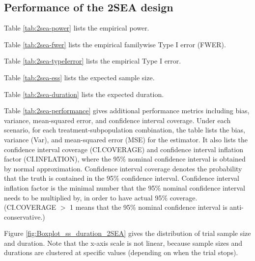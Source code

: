 \documentclass{article}\usepackage[]{graphicx}\usepackage[]{color}
\makeatletter
\newenvironment{kframe}{%
 \def\at@end@of@kframe{}%
 \ifinner\ifhmode%
  \def\at@end@of@kframe{\end{minipage}}%
  \begin{minipage}{\columnwidth}%
 \fi\fi%
 \def\FrameCommand##1{\hskip\@totalleftmargin \hskip-\fboxsep
 \colorbox{shadecolor}{##1}\hskip-\fboxsep
     \hskip-\linewidth \hskip-\@totalleftmargin \hskip\columnwidth}%
 \MakeFramed {\advance\hsize-\width
   \@totalleftmargin\z@ \linewidth\hsize
   \@setminipage}}%
 {\par\unskip\endMakeFramed%
 \at@end@of@kframe}
\numberwithin{table}{section}
\numberwithin{figure}{section}
\makeatother
\begin{document}
\subsection{Performance of the 2SEA design}


Table \ref{tab:2sea-power} lists the empirical power.

Table \ref{tab:2sea-fwer} lists the empirical familywise Type I error (FWER).

Table \ref{tab:2sea-typeIerror} lists the empirical Type I error.

Table \ref{tab:2sea-ess} lists the expected sample size.

Table \ref{tab:2sea-duration} lists the expected duration.

Table \ref{tab:2sea-performance} gives additional performance metrics including bias, variance, mean-squared error, and confidence interval coverage. Under each scenario, for each treatment-subpopulation combination, the table lists the bias, variance (Var), and mean-squared error (MSE) for the estimator. It also lists the confidence interval coverage (CI.COVERAGE) and confidence interval inflation factor (CI.INFLATION), where the 95\% nominal confidence interval is obtained by normal approximation. Confidence interval coverage denotes the probability that the truth is contained in the 95\% confidence interval. Confidence interval inflation factor is the minimal number that the 95\% nominal confidence interval needs to be multiplied by, in order to have actual 95\% coverage. (CI.COVERAGE $>$ 1 means that the 95\% nominal confidence interval is anti-conservative.)

Figure \ref{fig:Boxplot_ss_duration_2SEA} gives the distribution of trial sample size and duration. Note that the x-axis scale is not linear, because sample sizes and durations are clustered at specific values (depending on when the trial stops).

\begin{kframe}


{\ttfamily\noindent\bfseries{}}

{\ttfamily\noindent\bfseries\color{errorcolor}{\#\# Error in cbind(tsea.result\$optima\$empirical.power, tsea.result\$optima\$conj.power): object 'tsea.result' not found}}

{\ttfamily\noindent\bfseries\color{errorcolor}{\#\# Error in names(x) <- value: 'names' attribute [1] must be the same length as the vector [0]}}

{\ttfamily\noindent\bfseries\color{errorcolor}{\#\# Error in data.frame(Scenario = 1:n.scenarios, my.table): arguments imply differing number of rows: 1, 0}}\end{kframe}
\end{document}
